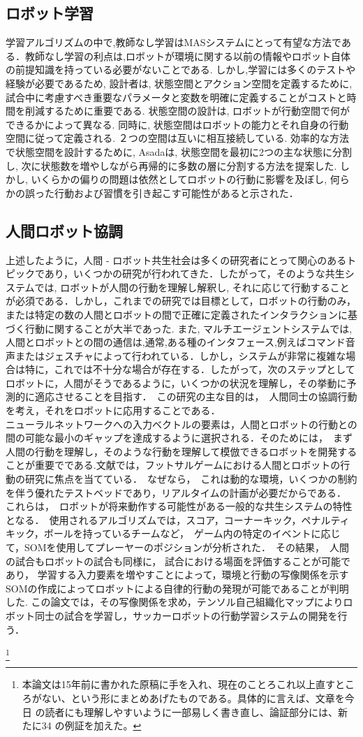 \subsection{ロボット学習}%
学習アルゴリズムの中で,教師なし学習はMASシステムにとって有望な方法である．教師なし学習の利点は,ロボットが環境に関する以前の情報やロボット自体の前提知識を持っている必要がないことである. しかし,学習には多くのテストや経験が必要であるため, 設計者は, 状態空間とアクション空間を定義するために, 試合中に考慮すべき重要なパラメータと変数を明確に定義することがコストと時間を削減するために重要である. 状態空間の設計は, ロボットが行動空間で何ができるかによって異なる. 同時に, 状態空間はロボットの能力とそれ自身の行動空間に従って定義される. ２つの空間は互いに相互接続している. 効率的な方法で状態空間を設計するために, Asada\cite{YT}は, 状態空間を最初に2つの主な状態に分割し, 次に状態数を増やしながら再帰的に多数の層に分割する方法を提案した. しかし, いくらかの偏りの問題は依然としてロボットの行動に影響を及ぼし, 何らかの誤った行動および習慣を引き起こす可能性があると示された．
\subsection{人間ロボット協調}%
上述したように，人間 - ロボット共生社会は多くの研究者にとって関心のあるトピックであり，いくつかの研究が行われてきた．したがって，そのような共生システムでは, ロボットが人間の行動を理解し解釈し, それに応じて行動することが必須である．しかし，これまでの研究では目標として，ロボットの行動のみ，または特定の数の人間とロボットの間で正確に定義されたインタラクションに基づく行動に関することが大半であった. また, マルチエージェントシステムでは,人間とロボットとの間の通信は,通常,ある種のインタフェース,例えばコマンド音声またはジェスチャによって行われている．しかし，システムが非常に複雑な場合は特に，これでは不十分な場合が存在する．したがって，次のステップとしてロボットに，人間がそうであるように，いくつかの状況を理解し，その挙動に予測的に適応させることを目指す．　この研究の主な目的は，　人間同士の協調行動を考え，それをロボットに応用することである．
\\ニューラルネットワークへの入力ベクトルの要素は，人間とロボットの行動との間の可能な最小のギャップを達成するように選択される．そのためには，　まず人間の行動を理解し，そのような行動を理解して模倣できるロボットを開発することが重要でである.文献\cite{MM}では，フットサルゲームにおける人間とロボットの行動の研究に焦点を当てている．　なぜなら，　これは動的な環境，いくつかの制約を伴う優れたテストベッドであり，リアルタイムの計画が必要だからである．　これらは，　ロボットが将来動作する可能性がある一般的な共生システムの特性となる．　使用されるアルゴリズムでは，スコア，コーナーキック，ペナルティキック，ボールを持っているチームなど，　ゲーム内の特定のイベントに応じて，SOMを使用してプレーヤーのポジションが分析された．　その結果，　人間の試合もロボットの試合も同様に， 試合における場面を評価することが可能であり， 学習する入力要素を増やすことによって，環境と行動の写像関係を示すSOMの作成によってロボットによる自律的行動の発現が可能であることが判明した. この論文では，その写像関係を求め，テンソル自己組織化マップによりロボット同士の試合を学習し，サッカーロボットの行動学習システムの開発を行う．


  \footnote{
本論文は15年前に書かれた原稿に手を入れ、現在のことろこれ以上直すとこ
ろがない、という形にまとめあげたものである。具体的に言えば、文章を今日
の読者にも理解しやすいように一部易しく書き直し、論証部分には、新たに34
の例証を加えた。
} %


